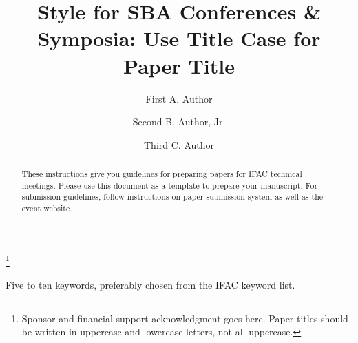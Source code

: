 \documentclass[a4paper]{ifacconf}
\begin{document}
\endNoHyper

\else
% 

\begin{frontmatter}

\title{Style for SBA Conferences \& Symposia: Use Title Case for
  Paper Title} 

\thanks[footnoteinfo]{Sponsor and financial support acknowledgment
goes here. Paper titles should be written in uppercase and lowercase
letters, not all uppercase.}

\author[First]{First A. Author} 
\author[Second]{Second B. Author, Jr.} 
\author[Third]{Third C. Author}


\address[First]{Faculdade de Engenharia Elétrica, Universidade do Triângulo, MG, (e-mail: autor1@faceg@univt.br).}
\address[Second]{Faculdade de Engenharia de Controle \& Automação, Universidade do Futuro, RJ (e-mail: autor2@feca.unifutu.rj)}
\address[Third]{Electrical Engineering Department, 
   Seoul National University, Seoul, Korea, (e-mail: author3@snu.ac.kr)}
   
\renewcommand{\abstractname}{{\bf Abstract:~}}   
   
\begin{abstract}                %
These instructions give you guidelines for preparing papers for IFAC
technical meetings. Please use this document as a template to prepare
your manuscript. For submission guidelines, follow instructions on
paper submission system as well as the event website.
\end{abstract}

\begin{keyword}
Five to ten keywords, preferably chosen from the IFAC keyword list.
\end{keyword}

\end{frontmatter}
\fi

\end{document}
